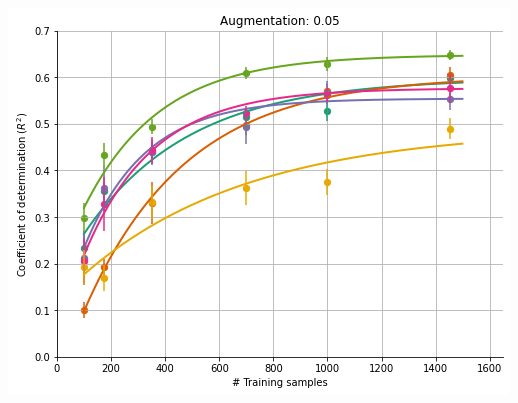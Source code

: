 \documentclass[a0paper,landscape,fontscale=0.365]{baposter}
\newenvironment{Figure}
  {\par\medskip\noindent\minipage{\linewidth}}
  {\endminipage\par\medskip}
\begin{document}
\begin{poster}
{\begin{multicols}{4}
    \begin{Figure}
        \centering
        \includegraphics[width=1.0\linewidth]{figures/curves_aug_20}
    \end{Figure}

    \columnbreak


\end{multicols}}
\end{poster}
\end{document}
